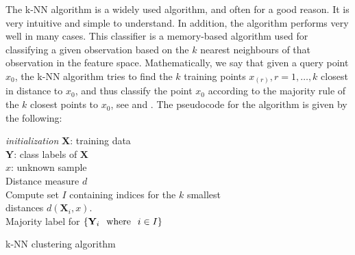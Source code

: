 \documentclass[../thesis.tex]{subfiles}
\begin{document}
\noindent The k-NN algorithm \citep{fix1951discriminatory} is a widely used algorithm, and often for a good reason. It is very intuitive and simple to understand. In addition, the algorithm performs very well in many cases. This classifier is a memory-based algorithm used for classifying a given observation based on the $k$ nearest neighbours of that observation in the feature space. Mathematically, we say that given a query point $x_0$, the k-NN algorithm tries to find the $k$ training points $x_{(r)}, r = 1, \hdots, k$ closest in distance to $x_0$, and thus classify the point $x_0$ according to the majority rule of the $k$ closest points to $x_0$, see \citep{friedman2009elements} and \citep{james2013introduction}. The pseudocode for the algorithm is given by the following:
\begin{algorithm}[H]{
\SetAlgoLined
\textit{initialization}\;
    \hspace{0.5cm} $\mathbf{X}$: training data\\
    \hspace{0.5cm} $\mathbf{Y}$: class labels of $\mathbf{X}$\\
    \hspace{0.5cm} $x$: unknown sample\\
    \hspace{0.5cm} Distance measure $d$\\
    Compute set $I$ containing indices for the $k$ smallest\\
    \hspace*{0,5cm}distances $d(\mathbf{X}_i, x)$.\\
    \Return Majority label for $\left\{ \mathbf{Y}_i \hspace{0.25cm} \text{where} \hspace{0.25cm} i \in I \right\}$
}
\caption{k-NN clustering algorithm}
\end{algorithm}
\end{document}
